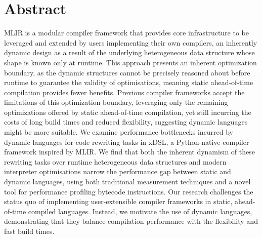 \chapter*{Abstract}


\makeatletter
{\large\textsl{\@title}}
\makeatother
\vspace{0.5em}

MLIR is a modular compiler framework that provides core infrastructure to be leveraged and extended by users implementing their own compilers, an inherently dynamic design as a result of the underlying heterogeneous data structure whose shape is known only at runtime. %
This approach presents an inherent optimization boundary, as the dynamic structures cannot be precisely reasoned about before runtime to guarantee the validity of optimisations, meaning static ahead-of-time compilation provides fewer benefits.
Previous compiler frameworks accept the limitations of this optimization boundary, leveraging only the remaining optimizations offered by static ahead-of-time compilation, yet still incurring the costs of long build times and reduced flexibility, suggesting dynamic languages might be more suitable.
We examine performance bottlenecks incurred by dynamic languages for code rewriting tasks in xDSL, a Python-native compiler framework inspired by MLIR.
We find that both the inherent dynamism of these rewriting tasks over runtime heterogeneous data structures and modern interpreter optimisations narrow the performance gap between static and dynamic languages, using both traditional measurement techniques and a novel tool for performance profiling bytecode instructions.
Our research challenges the status quo of implementing user-extensible compiler frameworks in static, ahead-of-time compiled languages.
Instead, we motivate the use of dynamic languages, demonstrating that they balance compilation performance with the flexibility and fast build times.

